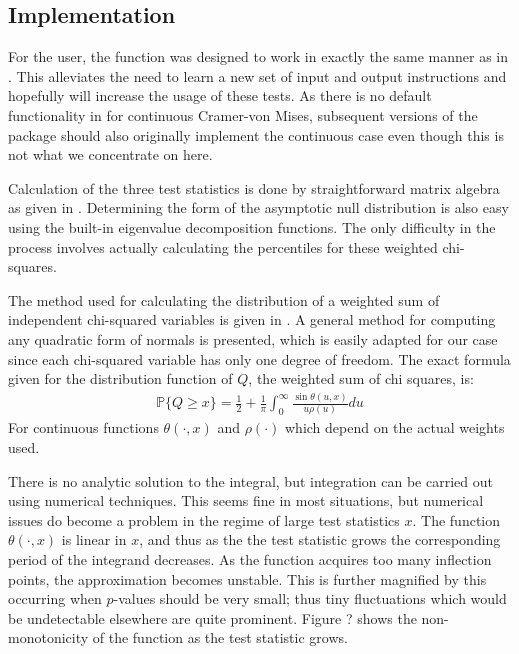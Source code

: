 \documentclass[article]{jss}
\begin{document}
\subsection{Implementation}

For the user, the function  was designed to work in exactly the same manner as  in . This
alleviates the need to learn a new set of input and output instructions and hopefully will increase the usage of these tests. 
As there is no default functionality in  for continuous Cramer-von Mises, subsequent versions of the package
should also originally implement the continuous case even though this is not what we concentrate on here. 

Calculation of the three test statistics is done by straightforward matrix algebra as given in \cite{choulakian1994}. Determining 
the form of the asymptotic null distribution is also easy using the built-in eigenvalue decomposition functions. The only 
difficulty in the process involves actually calculating the percentiles for these weighted chi-squares. 

The method used for calculating the distribution of a weighted sum of independent chi-squared variables is given in \cite{imhof1961}.
A general method for computing any quadratic form of normals is presented, which is easily adapted for our case since
each chi-squared variable has only one degree of freedom. The exact formula given for the distribution function of $Q$, the weighted
sum of chi squares, is:
\begin{align*}
\mathbb{P}\{Q \geq x \} = \frac{1}{2} + \frac{1}{\pi} \int_{0}^{\infty} \frac{\sin\theta(u,x)}{u \rho(u) } du
\end{align*}
For continuous functions $\theta(\cdot, x)$ and $\rho(\cdot)$ which depend on the actual weights used. 

There is no analytic solution to the integral, but integration can be carried out using numerical techniques. This seems
fine in most situations, but numerical issues do become a problem in the regime of large test statistics $x$. The function
$\theta(\cdot, x)$ is linear in $x$, and thus as the the test statistic grows the corresponding period of the integrand 
decreases. As the function acquires too many inflection points, the approximation becomes unstable. This is further
magnified by this occurring when $p$-values should be very small; thus tiny fluctuations which would be undetectable
elsewhere are quite prominent. Figure ? shows the non-monotonicity of the function as the test statistic grows.
\end{document}
